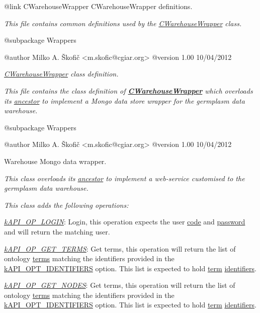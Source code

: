 {\itshape \begin{DoxyVerb} {@link CWarehouseWrapper CWarehouseWrapper} definitions.
\end{DoxyVerb}
}

{\itshape This file contains common definitions used by the \hyperlink{class_c_warehouse_wrapper}{C\-Warehouse\-Wrapper} class.}

{\itshape \begin{DoxyVerb} @subpackage        Wrappers

 @author            Milko A. Škofič <m.skofic@cgiar.org>
 @version   1.00 10/04/2012\end{DoxyVerb}
}

{\itshape {\itshape \hyperlink{class_c_warehouse_wrapper}{C\-Warehouse\-Wrapper}} class definition.}

{\itshape This file contains the class definition of {\bfseries \hyperlink{class_c_warehouse_wrapper}{C\-Warehouse\-Wrapper}} which overloads its \hyperlink{class_c_mongo_data_wrapper}{ancestor} to implement a Mongo data store wrapper for the germplasm data warehouse.}

{\itshape \begin{DoxyVerb} @subpackage        Wrappers

 @author            Milko A. Škofič <m.skofic@cgiar.org>
 @version   1.00 10/04/2012\end{DoxyVerb}
}

{\itshape \begin{DoxyVerb} Warehouse Mongo data wrapper.
\end{DoxyVerb}
}

{\itshape This class overloads its \hyperlink{class_c_mongo_data_wrapper}{ancestor} to implement a web-\/service customised to the germplasm data warehouse.}

{\itshape This class adds the following operations\-:}

{\itshape 
\begin{DoxyItemize}
\item {\itshape \hyperlink{}{k\-A\-P\-I\-\_\-\-O\-P\-\_\-\-L\-O\-G\-I\-N}}\-: Login, this operation expects the user \hyperlink{}{code} and \hyperlink{}{password} and will return the matching user. 
\item {\itshape \hyperlink{}{k\-A\-P\-I\-\_\-\-O\-P\-\_\-\-G\-E\-T\-\_\-\-T\-E\-R\-M\-S}}\-: Get terms, this operation will return the list of ontology \hyperlink{class_c_ontology_term}{terms} matching the identifiers provided in the \hyperlink{}{k\-A\-P\-I\-\_\-\-O\-P\-T\-\_\-\-I\-D\-E\-N\-T\-I\-F\-I\-E\-R\-S} option. This list is expected to hold \hyperlink{class_c_ontology_term}{term} \hyperlink{}{identifiers}. 
\item {\itshape \hyperlink{}{k\-A\-P\-I\-\_\-\-O\-P\-\_\-\-G\-E\-T\-\_\-\-N\-O\-D\-E\-S}}\-: Get terms, this operation will return the list of ontology \hyperlink{class_c_ontology_term}{terms} matching the identifiers provided in the \hyperlink{}{k\-A\-P\-I\-\_\-\-O\-P\-T\-\_\-\-I\-D\-E\-N\-T\-I\-F\-I\-E\-R\-S} option. This list is expected to hold \hyperlink{class_c_ontology_term}{term} \hyperlink{}{identifiers}. 
\end{DoxyItemize}}

